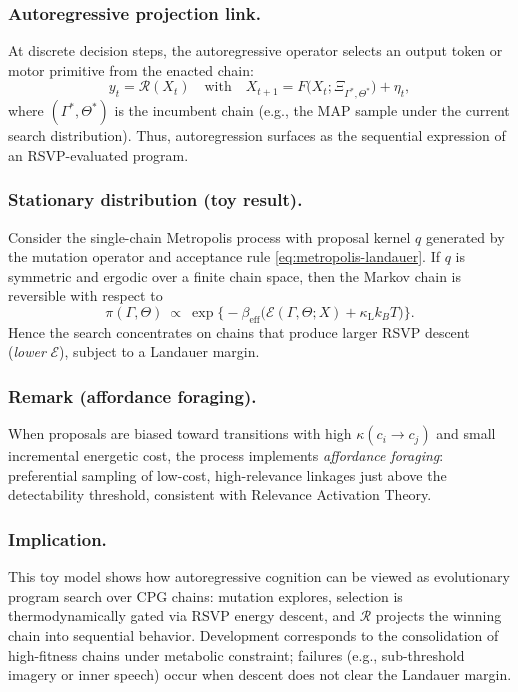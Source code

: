 \documentclass[a4paper,11pt]{article}
\begin{document}
\subsubsection{Autoregressive projection link.}
At discrete decision steps, the autoregressive operator selects an output token
or motor primitive from the enacted chain:
\begin{equation}
\label{eq:proj-cpg}
y_t=\mathcal{R}(X_t)
\quad\text{with}\quad
X_{t+1}=F\big(X_t;\Xi_{\Gamma^*,\Theta^*}\big)+\eta_t,
\end{equation}
where $(\Gamma^*,\Theta^*)$ is the incumbent chain (e.g., the MAP sample under the
current search distribution). Thus, autoregression surfaces as the sequential
expression of an RSVP-evaluated program.

\subsubsection{Stationary distribution (toy result).}
Consider the single-chain Metropolis process with proposal kernel $q$ generated
by the mutation operator and acceptance rule \eqref{eq:metropolis-landauer}.
If $q$ is symmetric and ergodic over a finite chain space, then the Markov
chain is reversible with respect to
\begin{equation}
\label{eq:stationary}
\pi(\Gamma,\Theta)\ \propto\ \exp\!\Big\{-\beta_{\mathrm{eff}}
\big(\mathcal{E}(\Gamma,\Theta;X)+\kappa_{\mathrm{L}} k_B T\big)\Big\}.
\end{equation}
Hence the search concentrates on chains that produce larger RSVP descent
(\emph{lower} $\mathcal{E}$), subject to a Landauer margin.

\subsubsection{Remark (affordance foraging).}
When proposals are biased toward transitions with high $\kappa(c_i\!\to\! c_j)$
and small incremental energetic cost, the process implements \emph{affordance
foraging}: preferential sampling of low-cost, high-relevance linkages just above
the detectability threshold, consistent with Relevance Activation Theory.

\subsubsection{Implication.}
This toy model shows how autoregressive cognition can be viewed as evolutionary
program search over CPG chains: mutation explores, selection is thermodynamically
gated via RSVP energy descent, and $\mathcal{R}$ projects the winning chain into
sequential behavior. Development corresponds to the consolidation of high-fitness
chains under metabolic constraint; failures (e.g., sub-threshold imagery or inner
speech) occur when descent does not clear the Landauer margin.
\end{document}
